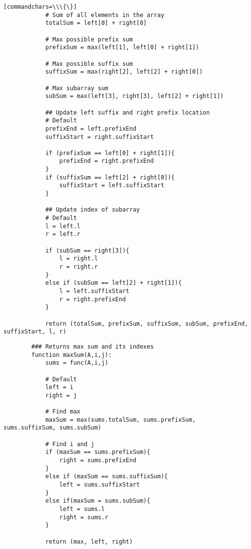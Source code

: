\documentclass[12pt]{article}
\begin{document}
\begin{enumerate}
\begin{verbatim}[commandchars=\\\{\}]
            # Sum of all elements in the array
            totalSum = left[0] + right[0]

            # Max possible prefix sum
            prefixSum = max(left[1], left[0] + right[1])

            # Max possible suffix sum
            suffixSum = max(right[2], left[2] + right[0])

            # Max subarray sum
            subSum = max(left[3], right[3], left[2] + right[1]) 

            ## Update left suffix and right prefix location
            # Default
            prefixEnd = left.prefixEnd
            suffixStart = right.suffixStart

            if (prefixSum == left[0] + right[1]){
                prefixEnd = right.prefixEnd
            }
            if (suffixSum == left[2] + right[0]){
                suffixStart = left.suffixStart
            }

            ## Update index of subarray
            # Default 
            l = left.l
            r = left.r

            if (subSum == right[3]){
                l = right.l
                r = right.r
            }
            else if (subSum == left[2] + right[1]){
                l = left.suffixStart
                r = right.prefixEnd
            }

            return (totalSum, prefixSum, suffixSum, subSum, prefixEnd, suffixStart, l, r)
    \end{verbatim}

    \begin{verbatim}
        ### Returns max sum and its indexes
        function maxSum(A,i,j):
            sums = func(A,i,j)

            # Default
            left = i
            right = j

            # Find max
            maxSum = max(sums.totalSum, sums.prefixSum, sums.suffixSum, sums.subSum)

            # Find i and j
            if (maxSum == sums.prefixSum){
                right = sums.prefixEnd
            }
            else if (maxSum == sums.suffixSum){
                left = sums.suffixStart
            }
            else if(maxSum = sums.subSum){
                left = sums.l
                right = sums.r
            }

            return (max, left, right)

    \end{verbatim}

\end{enumerate}
\end{document}
